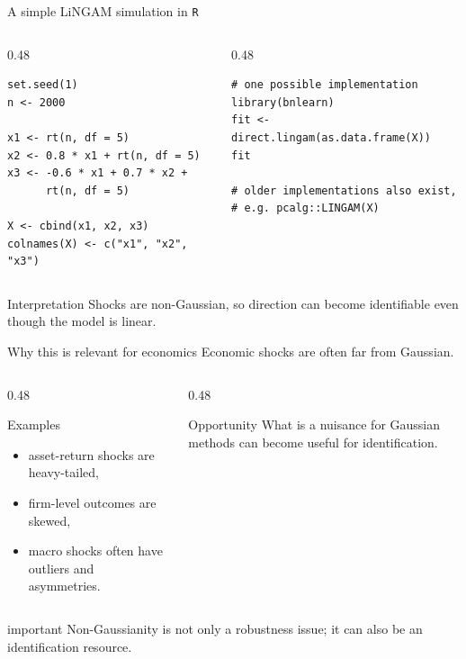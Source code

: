 \documentclass[dvipsnames,aspectratio=169,handout]{beamer}
\begin{document}
\begin{frame}[fragile]{A simple LiNGAM simulation in \texttt{R}}
\begin{columns}[T,onlytextwidth]
\begin{column}{0.48\textwidth}
\begin{lstlisting}
set.seed(1)
n <- 2000

x1 <- rt(n, df = 5)
x2 <- 0.8 * x1 + rt(n, df = 5)
x3 <- -0.6 * x1 + 0.7 * x2 +
      rt(n, df = 5)

X <- cbind(x1, x2, x3)
colnames(X) <- c("x1", "x2", "x3")
\end{lstlisting}
\end{column}
\begin{column}{0.48\textwidth}
\begin{lstlisting}
# one possible implementation
library(bnlearn)
fit <- direct.lingam(as.data.frame(X))
fit

# older implementations also exist,
# e.g. pcalg::LINGAM(X)
\end{lstlisting}
\end{column}
\end{columns}

\begin{alertblock}{Interpretation}
Shocks are non-Gaussian, so direction can become identifiable even though the model is linear.
\end{alertblock}
\end{frame}

\begin{frame}{Why this is relevant for economics}
Economic shocks are often far from Gaussian.

\begin{columns}[T]
\begin{column}{0.48\textwidth}
\begin{block}{Examples}
\begin{itemize}
    \item asset-return shocks are heavy-tailed,
    \item firm-level outcomes are skewed,
    \item macro shocks often have outliers and asymmetries.
\end{itemize}
\end{block}
\end{column}
\begin{column}{0.48\textwidth}
\begin{block}{Opportunity}
What is a nuisance for Gaussian methods can become useful for identification.
\end{block}
\end{column}
\end{columns}

\begin{beamercolorbox}[wd=\textwidth,sep=7pt,center,rounded=true,shadow=true]{important}
Non-Gaussianity is not only a robustness issue; it can also be an identification resource.
\end{beamercolorbox}
\end{frame}
\end{document}
